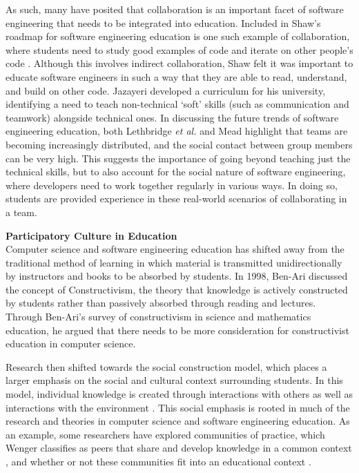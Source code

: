 As such, many have posited that collaboration is an important facet of software engineering that needs to be integrated into education. Included in Shaw’s roadmap for software engineering education is one such example of collaboration, where students need to study good examples of code and iterate on other people’s code \cite{shaw2000software}. Although this involves indirect collaboration, Shaw felt it was important to educate software engineers in such a way that they are able to read, understand, and build on other code. Jazayeri \cite{jazayeri2004education} developed a curriculum for his university, identifying a need to teach non-technical `soft' skills (such as communication and teamwork) alongside technical ones. In discussing the future trends of software engineering education, both Lethbridge \textit{et al.} \cite{lethbridge2007improving} and Mead \cite{mead2009software} highlight that teams are becoming increasingly distributed, and the social contact between group members can be very high. This suggests the importance of going beyond teaching just the technical skills, but to also account for the social nature of software engineering, where developers need to work together regularly in various ways. In doing so, students are provided experience in these real-world scenarios of collaborating in a team.


\textbf{Participatory Culture in Education} \\
Computer science and software engineering education has shifted away from the traditional method of learning in which material is transmitted unidirectionally by instructors and books to be absorbed by students. In 1998, Ben-Ari \cite{ben1998constructivism} discussed the concept of Constructivism, the theory that knowledge is actively constructed by students rather than passively absorbed through reading and lectures. Through Ben-Ari’s survey of constructivism in science and mathematics education, he argued that there needs to be more consideration for constructivist education in computer science.

Research then shifted towards the social construction model, which places a larger emphasis on the social and cultural context surrounding students. In this model, individual knowledge is created through interactions with others as well as interactions with the environment \cite{kim2001social}. This social emphasis is rooted in much of the research and theories in computer science and software engineering education. As an example, some researchers have explored communities of practice, which Wenger classifies as peers that share and develop knowledge in a common context \cite{wenger1998communities}, and whether or not these communities fit into an educational context \cite{ben2004situated}.


